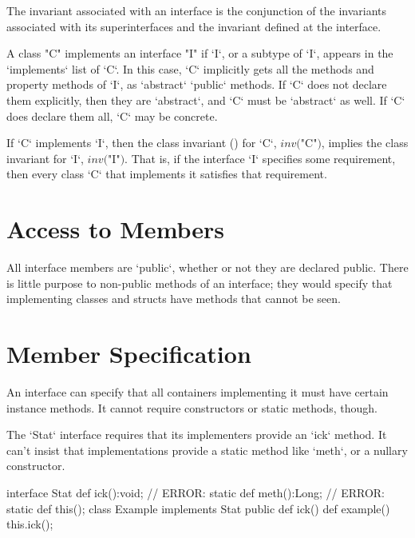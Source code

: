 \noindent
The invariant associated with an interface is the conjunction of the
invariants associated with its superinterfaces and the invariant
defined at the interface. 



A class \xcd"C"  implements an interface \xcd"I" if \xcd`I`, or a subtype of \xcd`I`, appears in the \xcd`implements` list
of \xcd`C`.  
In this case,
 \xcd`C` implicitly gets all the methods and property methods of \xcd`I`,
      as \xcd`abstract` \xcd`public` methods.  If \xcd`C` does not declare
      them explicitly, then they are \xcd`abstract`, and \xcd`C` must be
      \xcd`abstract` as well.   If \xcd`C` does declare them all, \xcd`C` may
      be concrete.



If \xcd`C` implements \xcd`I`, then the class invariant
() for \xcd`C`,   $\mathit{inv}($\xcd"C"$)$, implies
the class invariant for \xcd`I`, $\mathit{inv}($\xcd"I"$)$.  That is, if the
interface \xcd`I` specifies some requirement, then every class \xcd`C` that
implements it satisfies that requirement.

\section{Access to Members}

All interface members are \xcd`public`, whether or not they are declared
public.  There is little purpose to non-public methods of an interface; they
would specify that implementing classes and structs have methods that cannot
be seen.

\section{Member Specification}


An interface can specify that all containers implementing it must have certain
instance methods.  It cannot require constructors or static methods, though.


\begin{ex}
The \xcd`Stat` interface requires that its implementers provide 
an \xcd`ick` method.  
It can't insist that implementations provide a static method 
like \xcd`meth`, or a nullary constructor.
% 
\begin{xten}
interface Stat {
  def ick():void; 
  // ERROR: static def meth():Long;
  // ERROR: static def this();
}
class Example implements Stat {
  public def ick() {}
  def example() {
     this.ick();
  }
}
\end{xten}
%

\end{ex}

